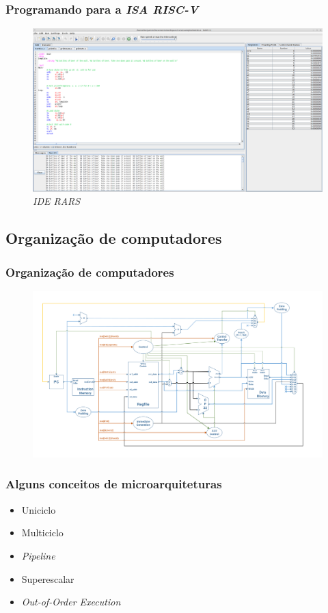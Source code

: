 \documentclass{beamer}
\begin{document}
    \begin{frame}
        \frametitle{Programando para a \textit{ISA RISC-V}}
        \begin{figure}[H]
        \centering
            \includegraphics[width=.9\textwidth,height=.9\textheight,keepaspectratio]{../images/rars.png}
            \caption{\textit{IDE RARS}}
        \end{figure}
    \end{frame}

    \subsection{Organização de computadores}
    \begin{frame}
        \frametitle{Organização de computadores}
        \begin{figure}[H]
        \centering
            \includegraphics[width=.9\textwidth,height=.9\textheight,keepaspectratio]{../images/singlecycle_generic.png}
        \end{figure}
    \end{frame}

    \begin{frame}
        \frametitle{Alguns conceitos de microarquiteturas}
        \begin{itemize}
            \item Uniciclo
            \item Multiciclo
            \item \textit{Pipeline}
            \item Superescalar
            \item \textit{Out-of-Order Execution}
        \end{itemize}
    \end{frame}
\end{document}
